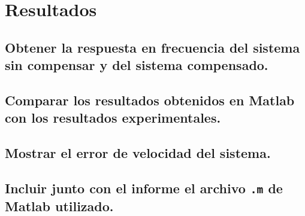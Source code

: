 \section{Resultados}
\subsection{Obtener la respuesta en frecuencia del sistema sin compensar y del sistema compensado.}

\subsection{Comparar los resultados obtenidos en Matlab con los resultados experimentales.}


\subsection{Mostrar el error de velocidad del sistema.}


\subsection{Incluir junto con el informe el archivo \texttt{.m} de Matlab utilizado.}
